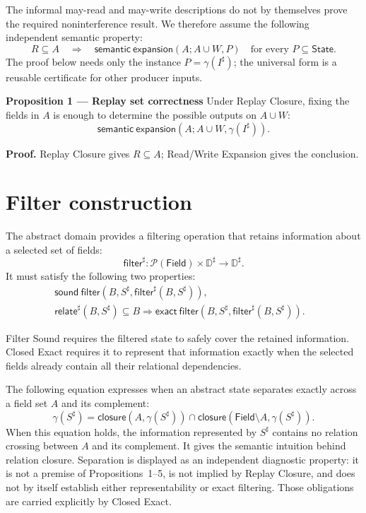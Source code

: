 \documentclass[10pt]{article}
\newcommand{\boxheading}[1]{\textbf{#1}\quad}
\newcommand{\Field}{\mathsf{Field}}
\newcommand{\State}{\mathsf{State}}
\newcommand{\ProjClose}{\mathsf{closure}}
\newcommand{\filter}{\mathsf{filter}}
\newcommand{\relate}{\mathsf{relate}}
\newcommand{\SemanticExpand}{\mathsf{semantic\ expansion}}
\newcommand{\SoundFilter}{\mathsf{sound\ filter}}
\newcommand{\ExactFilter}{\mathsf{exact\ filter}}
\newcommand{\qedbox}{\hfill\raisebox{0.15ex}{\fboxsep=0pt\fbox{\rule{0pt}{0.55em}\rule{0.55em}{0pt}}}}
\begin{document}
The informal may-read and may-write descriptions do not by themselves prove the required
noninterference result. We therefore assume the following independent semantic property:
\[
  R\subseteq A
  \quad\Longrightarrow\quad
  \SemanticExpand(A;A\cup W,P)
  \quad\text{for every }P\subseteq\State.
  \tag{Read/Write Expansion}
\]
The proof below needs only the instance \(P=\gamma(I^\sharp)\); the universal form is a reusable
certificate for other producer inputs.

\begin{statementbox}
\boxheading{Proposition 1 --- Replay set correctness}
Under Replay Closure, fixing the fields in \(A\) is enough to determine the possible outputs on
\(A\cup W\):
\[
  \SemanticExpand(A;A\cup W,\gamma(I^\sharp)).
\]
\end{statementbox}

\textbf{Proof.}
Replay Closure gives \(R\subseteq A\); Read/Write Expansion gives the conclusion. \qedbox

\section{Filter construction}

The abstract domain provides a filtering operation that retains information about a selected set
of fields:
\[
  \filter^\sharp:
  \mathcal P(\Field)\times\mathbb D^\sharp\to\mathbb D^\sharp.
\]
It must satisfy the following two properties:
\begin{align*}
  &\SoundFilter\!\left(B,S^\sharp,\filter^\sharp(B,S^\sharp)\right),
  &&\tag{Filter Sound}\\
  &\relate^\sharp(B,S^\sharp)\subseteq B
  \Longrightarrow
  \ExactFilter\!\left(B,S^\sharp,\filter^\sharp(B,S^\sharp)\right).
  &&\tag{Closed Exact}
\end{align*}

Filter Sound requires the filtered state to safely cover the retained information. Closed Exact
requires it to represent that information exactly when the selected fields already contain all
their relational dependencies.

The following equation expresses when an abstract state separates exactly across a field set
\(A\) and its complement:
\[
  \gamma(S^\sharp)
  =
  \ProjClose\!\left(A,\gamma(S^\sharp)\right)
  \cap
  \ProjClose\!\left(\Field\setminus A,\gamma(S^\sharp)\right).
  \tag{Separation}
\]
When this equation holds, the information represented by \(S^\sharp\) contains no relation
crossing between \(A\) and its complement. It gives the semantic intuition behind relation
closure. Separation is displayed as an independent diagnostic property: it is not a premise of
Propositions~1--5, is not implied by Replay Closure, and does not by itself establish either
representability or exact filtering. Those obligations are carried explicitly by Closed Exact.
\end{document}
